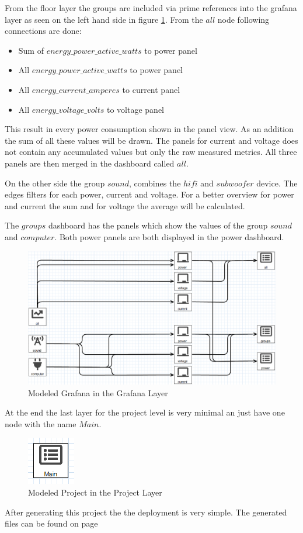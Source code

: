 From the floor layer the groups are included via prime references into the grafana layer as seen on the left hand side in figure \ref{fig:modelGrafanaLayer}. From the $all$ node following connections are done:

\begin{itemize}
	\item Sum of $energy\_power\_active\_watts$ to power panel
	\item All $energy\_power\_active\_watts$ to power panel
	\item All $energy\_current\_amperes$ to current panel
 	\item All $energy\_voltage\_volts$ to voltage panel
\end{itemize}

This result in every power consumption shown in the panel view. As an addition the sum of all these values will be drawn. The panels for current and voltage does not contain any accumulated values but only the raw measured metrics. All three panels are then merged in the dashboard called $all$.

On the other side the group $sound$, combines the $hifi$ and $subwoofer$ device. The edges filters for each power, current and voltage. For a better overview for power and current the sum and for voltage the average will be calculated. 

The $groups$ dashboard has the panels which show the values of the group $sound$ and $computer$. Both power panels are both displayed in the power dashboard.

\begin{figure}[H]
	\centering 
	\includegraphics[width=\linewidth]{assets/images/grafanaLayer}
	\caption{Modeled Grafana in the Grafana Layer}
	\label{fig:modelGrafanaLayer}
\end{figure}

At the end the last layer for the project level is very minimal an just have one node with the name $Main$.

\begin{figure}[H]
	\centering
	\includegraphics{assets/images/projectLayer}
	\caption{Modeled Project in the Project Layer}
\end{figure}

After generating this project the the deployment is very simple. The generated files can be found on page \pageref{label}
